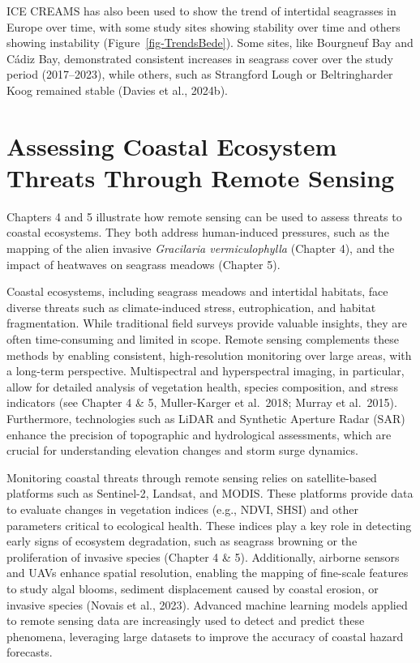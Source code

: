 \documentclass[
  letterpaper,
  11pt,
  english,
  singlespacing,
  headsepline]{MastersDoctoralThesis}
\begin{document}
\begin{spacing}{1.5}
ICE CREAMS has also been used to show the trend of intertidal seagrasses
in Europe over time, with some study sites showing stability over time
and others showing instability (Figure~\ref{fig-TrendsBede}). Some
sites, like Bourgneuf Bay and Cádiz Bay, demonstrated consistent
increases in seagrass cover over the study period (2017--2023), while
others, such as Strangford Lough or Beltringharder Koog remained stable
(Davies et al., 2024b).

\section{Assessing Coastal Ecosystem Threats Through Remote
Sensing}\label{assessing-coastal-ecosystem-threats-through-remote-sensing}

Chapters 4 and 5 illustrate how remote sensing can be used to assess
threats to coastal ecosystems. They both address human-induced
pressures, such as the mapping of the alien invasive \emph{Gracilaria
vermiculophylla} (Chapter 4), and the impact of heatwaves on seagrass
meadows (Chapter 5).

Coastal ecosystems, including seagrass meadows and intertidal habitats,
face diverse threats such as climate-induced stress, eutrophication, and
habitat fragmentation. While traditional field surveys provide valuable
insights, they are often time-consuming and limited in scope. Remote
sensing complements these methods by enabling consistent,
high-resolution monitoring over large areas, with a long-term
perspective. Multispectral and hyperspectral imaging, in particular,
allow for detailed analysis of vegetation health, species composition,
and stress indicators (see Chapter 4 \& 5, Muller-Karger et al.~2018;
Murray et al.~2015). Furthermore, technologies such as LiDAR and
Synthetic Aperture Radar (SAR) enhance the precision of topographic and
hydrological assessments, which are crucial for understanding elevation
changes and storm surge dynamics.

Monitoring coastal threats through remote sensing relies on
satellite-based platforms such as Sentinel-2, Landsat, and MODIS. These
platforms provide data to evaluate changes in vegetation indices (e.g.,
NDVI, SHSI) and other parameters critical to ecological health. These
indices play a key role in detecting early signs of ecosystem
degradation, such as seagrass browning or the proliferation of invasive
species (Chapter 4 \& 5). Additionally, airborne sensors and UAVs
enhance spatial resolution, enabling the mapping of fine-scale features
to study algal blooms, sediment displacement caused by coastal erosion,
or invasive species (Novais et al., 2023). Advanced machine learning
models applied to remote sensing data are increasingly used to detect
and predict these phenomena, leveraging large datasets to improve the
accuracy of coastal hazard forecasts.


\end{spacing}
\end{document}
